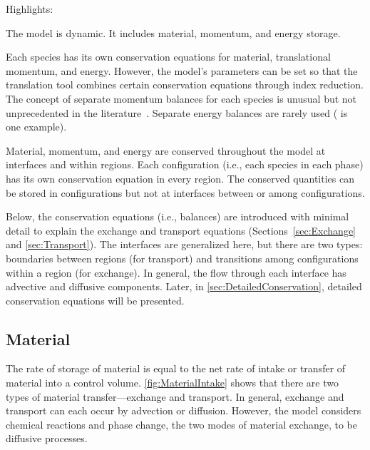 \begin{contextbox}
  Highlights:
  \begin{itemize*}
    \item The model is dynamic.  It includes material, momentum, and energy storage.
    \item Each species has its own conservation equations for material, translational momentum, and energy.  However, the model's parameters can be set so that the translation tool combines certain conservation equations through index reduction.  The concept of separate momentum balances for each species is unusual but not unprecedented in the literature~\cite{Wesselingh2000, Kerkhof2005AIChE, Kerkhof2005ChemEngSci}.  Separate energy balances are rarely used (\cite{Kuropatenko2005} is one example).
  \end{itemize*}
\end{contextbox}
\vspace{0.7\baselineskip}

Material, momentum, and energy are conserved throughout the model at interfaces and within regions.  Each configuration (i.e., each species in each phase) has its own conservation equation in every region.  The conserved quantities can be stored in configurations but not at interfaces between or among configurations.

Below, the conservation equations (i.e., balances) are introduced with minimal detail to explain the exchange and transport equations (Sections~\ref{sec:Exchange} and \ref{sec:Transport}).  The interfaces are generalized here, but there are two types:  boundaries between regions (for transport) and transitions among configurations within a region (for exchange).  In general, the flow through each interface has advective and diffusive components.  Later, in \autoref{sec:DetailedConservation}, detailed conservation equations will be presented.


\subsection{Material}
\label{sec:BasicMaterialBalance}


The rate of storage of material is equal to the net rate of intake or transfer of material into a control volume.  \autoref{fig:MaterialIntake} shows that there are two types of material transfer---exchange and transport.  In general, exchange and transport can each occur by advection or diffusion.  However, the model considers chemical reactions and phase change, the two modes of material exchange, to be diffusive processes.

